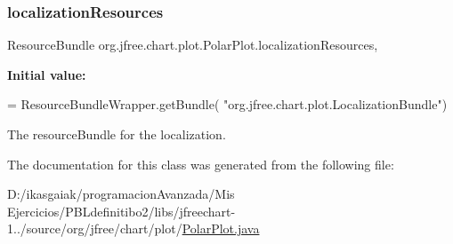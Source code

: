 \subsubsection{\texorpdfstring{localization\+Resources}{localizationResources}}
{\footnotesize\ttfamily Resource\+Bundle org.\+jfree.\+chart.\+plot.\+Polar\+Plot.\+localization\+Resources\hspace{0.3cm}{\ttfamily [static]}, {\ttfamily [protected]}}

{\bfseries Initial value\+:}
\begin{DoxyCode}
= ResourceBundleWrapper.getBundle(
                    \textcolor{stringliteral}{"org.jfree.chart.plot.LocalizationBundle"})
\end{DoxyCode}
The resource\+Bundle for the localization. 

The documentation for this class was generated from the following file\+:\begin{DoxyCompactItemize}
\item 
D\+:/ikasgaiak/programacion\+Avanzada/\+Mis Ejercicios/\+P\+B\+Ldefinitibo2/libs/jfreechart-\/1../source/org/jfree/chart/plot/\mbox{\hyperlink{_polar_plot_8java}{Polar\+Plot.\+java}}\end{DoxyCompactItemize}
